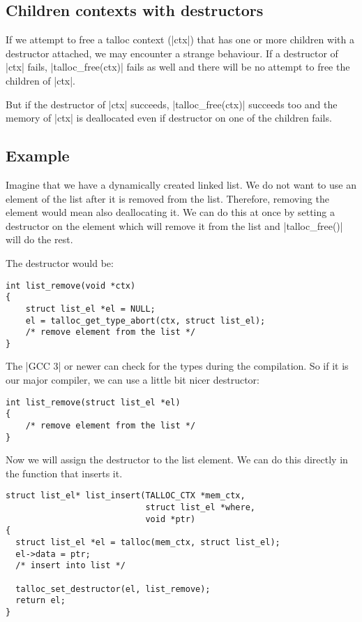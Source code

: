 \subsection{Children contexts with destructors}

If we attempt to free a talloc context (|ctx|) that has one or more children
with a destructor attached, we may encounter a strange behaviour. If a
destructor of |ctx| fails, |talloc_free(ctx)| fails as well and there will
be no attempt to free the children of |ctx|.

But if the destructor of |ctx| succeeds, |talloc_free(ctx)| succeeds too and
the memory of |ctx| is deallocated even if destructor on one of the children
fails.

\subsection{Example}

Imagine that we have a dynamically created linked list. We do not want to use an
element of the list after it is removed from the list. Therefore, removing the
element would mean also deallocating it. We can do this at once by setting a
destructor on the element which will remove it from the list and
|talloc_free()| will do the rest.

The destructor would be:

\begin{lstlisting}[caption={Remove an element from the list -- destructor}]
int list_remove(void *ctx)
{
    struct list_el *el = NULL;
    el = talloc_get_type_abort(ctx, struct list_el);
    /* remove element from the list */    
}
\end{lstlisting}

\noindent
The |GCC 3| or newer can check for the types during the compilation. So if it is
our major compiler, we can use a little bit nicer destructor:

\begin{lstlisting}[caption={Remove an element from the list -- type-safe
destructor}]
int list_remove(struct list_el *el)
{
    /* remove element from the list */    
}
\end{lstlisting}

\noindent
Now we will assign the destructor to the list element. We can do this directly
in the function that inserts it.

\begin{lstlisting}[caption={Remove an element from the list when freed},
morekeywords={talloc_set_destructor}]
struct list_el* list_insert(TALLOC_CTX *mem_ctx,
                            struct list_el *where,
                            void *ptr)
{
  struct list_el *el = talloc(mem_ctx, struct list_el);
  el->data = ptr;
  /* insert into list */
  
  talloc_set_destructor(el, list_remove);
  return el;
}
\end{lstlisting}

